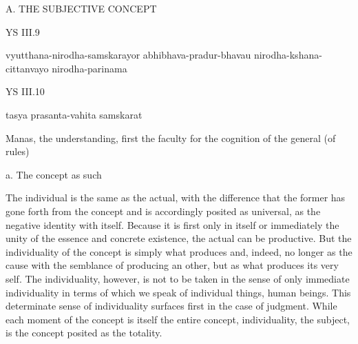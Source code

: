 A. THE SUBJECTIVE CONCEPT

YS III.9

vyutthana-nirodha-samskarayor abhibhava-pradur-bhavau nirodha-kshana-cittanvayo nirodha-parinama

YS III.10

tasya prasanta-vahita samskarat

Manas, the understanding, first the faculty for the cognition of the general (of rules)

a. The concept as such

The individual is the same as the actual, with the difference that the
former has gone forth from the concept and is accordingly posited as
universal, as the negative identity with itself.
Because it is first only in itself or immediately the unity of
the essence and concrete existence, the actual can be productive.
But the individuality of the concept is simply what produces and, indeed,
no longer as the cause with the semblance of producing an other,
but as what produces its very self.
The individuality, however, is not to be taken in the sense of
only immediate individuality in terms of which
we speak of individual things, human beings.
This determinate sense of individuality surfaces first in the case of judgment.
While each moment of the concept is itself the entire concept,
individuality, the subject, is the concept posited as the totality.

